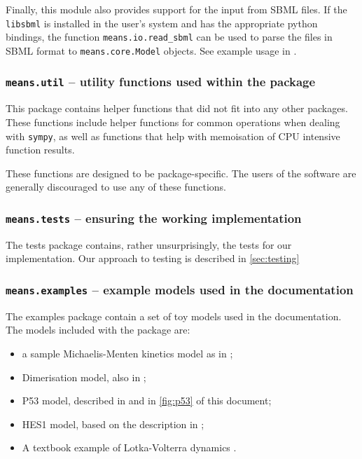 Finally, this module also provides support for the input from SBML files.
If the \verb`libsbml` is installed in the user's system and has the appropriate python bindings, the function \verb`means.io.read_sbml` can be used to parse the files in SBML format
to \verb`means.core.Model` objects. See example usage in .

\subsubsection{{\tt means.util} -- utility functions used within the package}
This package contains helper functions that did not fit into any other packages.
These functions include helper functions for common operations when dealing with \verb`sympy`,
as well as functions that help with memoisation of CPU intensive function results.

These functions are designed to be package-specific.
The users of the software are generally discouraged to use any of these functions.

\subsubsection{{\tt means.tests} -- ensuring the working implementation}
The tests package contains, rather unsurprisingly, the tests for our implementation.
Our approach to testing is described in \autoref{sec:testing}

\subsubsection{{\tt means.examples} -- example models used in the documentation}
The examples package contain a set of toy models used in the documentation.
The models included with the package are:
\begin{itemize}
    \item a sample Michaelis-Menten kinetics model as in \cite{ale_general_2013};
    \item Dimerisation model, also in \cite{ale_general_2013};
    \item P53 model, described in \cite{ale_general_2013} and in \autoref{fig:p53} of this document;
    \item HES1 model, based on the description in \cite{ale_general_2013} ;
    \item A textbook example of Lotka-Volterra dynamics .
\end{itemize}

